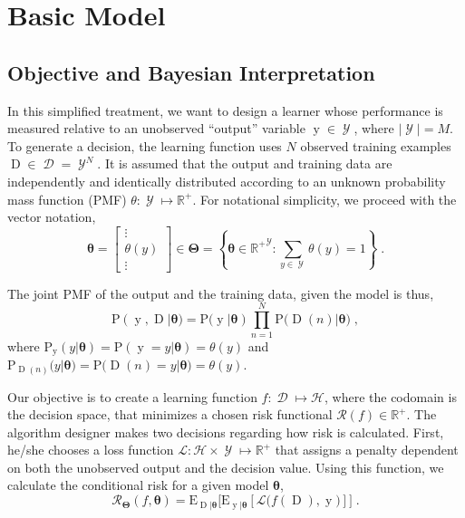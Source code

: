 \documentclass[12pt]{report}
\DeclareMathOperator{\yrm}{\mathrm{y}}
\DeclareMathOperator{\Drm}{\mathrm{D}}
\DeclareMathOperator{\Ycal}{\mathcal{Y}}
\DeclareMathOperator{\Dcal}{\mathcal{D}}
\begin{document}
\section{Basic Model}


\subsection{Objective and Bayesian Interpretation}

In this simplified treatment, we want to design a learner whose performance is measured relative to an unobserved ``output'' variable $\yrm \in \Ycal$, where $|\Ycal| = M$. To generate a decision, the learning function uses $N$ observed training examples $\Drm \in \Dcal = \Ycal^N$. It is assumed that the output and training data are independently and identically distributed according to an unknown probability mass function (PMF) $\theta: \Ycal \mapsto \mathbb{R}^+$. For notational simplicity, we proceed with the vector notation, 
\begin{equation}
\bm{\theta} = \begin{bmatrix} \vdots \\ \theta(y) \\ \vdots \end{bmatrix} \in \bm{\Theta} 
= \left\{ \bm{\theta} \in {\mathbb{R}^+}^{\Ycal}: \sum_{y \in \Ycal} \theta(y) = 1 \right\} \;.
\end{equation}

The joint PMF of the output and the training data, given the model is thus,
\begin{equation}
\text{P}(\yrm,\Drm | \bm{\theta}) = \text{P}(\yrm | \bm{\theta}) \prod_{n=1}^N \text{P}\big( \Drm(n) | \bm{\theta} \big) \;,
\end{equation}
where $\text{P}_{\yrm}(y|\bm{\theta}) = \text{P}(\yrm = y | \bm{\theta}) = \theta(y)$ and $\text{P}_{\Drm(n)}(y|\bm{\theta}) = \text{P}\big( \Drm(n) = y | \bm{\theta} \big) = \theta(y)$.

Our objective is to create a learning function $f: \Dcal \mapsto \mathcal{H}$, where the codomain is the decision space, that minimizes a chosen risk functional $\mathcal{R}(f) \in \mathbb{R}^+$.  The algorithm designer makes two decisions regarding how risk is calculated. First, he/she chooses a loss function $\mathcal{L}: \mathcal{H} \times \Ycal \mapsto \mathbb{R}^+$ that assigns a penalty dependent on both the unobserved output and the decision value. Using this function, we calculate the conditional risk for a given model $\bm{\theta}$,
\begin{equation}
\mathcal{R}_{\bm{\Theta}}(f,\bm{\theta}) = \text{E}_{\Drm|\bm{\theta}} \Big[ \text{E}_{\yrm|\bm{\theta}} \left[ \mathcal{L}\big( f(\Drm),\yrm \big) \right] \Big] \;.
\end{equation}
\end{document}
